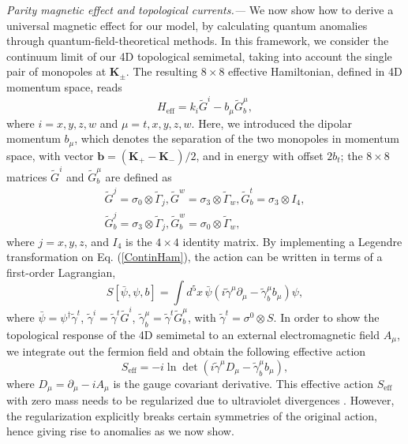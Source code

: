 \documentclass[twocolumn,prl,10pt,superscriptaddress]{revtex4}
\begin{document}
\emph{Parity magnetic effect and topological currents.---}
We now show how to derive a universal magnetic effect for our model, by calculating quantum anomalies through quantum-field-theoretical methods. In this framework, we consider the continuum limit of our 4D topological semimetal, taking into account the single pair of monopoles at ${\boldsymbol K}_{\pm}$. The resulting $8\times8$ effective Hamiltonian, defined in 4D momentum space, reads
\begin{equation}\label{ContinHam}
H_{\text{eff}}=k_{i}\tilde{G}^{i}-b_{\mu}\tilde{G}_b^{\mu},
\end{equation}
where $i=x,y,z,w$ and $\mu=t,x,y,z,w$. Here, we introduced the dipolar momentum $b_{\mu}$, which denotes the separation of the two monopoles in momentum space, with vector ${\boldsymbol b}=({\boldsymbol K}_+-{\boldsymbol K}_-)/2$, and in energy with offset $2b_t$; the $8\times8$ matrices $\tilde{G}^{i}$ and $\tilde{G}_b^{\mu}$ are defined as
\begin{eqnarray}
  \tilde{G}^{j}=\sigma_0\otimes\tilde{\Gamma}_{j}, \tilde{G}^{w}=\sigma_3\otimes\tilde{\Gamma}_{w}, \tilde{G}^{t}_b=\sigma_3\otimes I_4, \nonumber \\  \tilde{G}^{j}_b=\sigma_3\otimes\tilde{\Gamma}_{j}, \tilde{G}^{w}_b=\sigma_0\otimes\tilde{\Gamma}_{w},
  \end{eqnarray}
  where $j=x,y,z$, and $I_4$ is the $4\times4$ identity matrix.  By implementing a Legendre transformation on Eq. (\ref{ContinHam}), the action can be written in terms of a first-order Lagrangian,
\begin{equation}
S[\bar{\psi},\psi,b]=\int d^5x\,\bar{\psi}(i\tilde{\gamma}^{\mu}\partial_{\mu}-\tilde{\gamma}^{\mu}_bb_{\mu})\psi,
\end{equation}
where $\bar{\psi}=\psi^{\dagger}\tilde{\gamma}^t$, $\tilde{\gamma}^{i}=\tilde{\gamma}^t\tilde{G}^{i}$, $\tilde{\gamma}^{\mu}_b=\tilde{\gamma}^t\tilde{G}_b^{\mu}$, with $\tilde{\gamma}^t=\sigma^0\otimes S$. In order to show the topological response of the 4D semimetal to an external electromagnetic field $A_{\mu}$, we integrate out the fermion field and obtain the following effective action
\begin{equation}\label{effaction}
S_{\text{eff}}=-i\ln \det(i\tilde{\gamma}^{\mu}D_{\mu}-\tilde{\gamma}^{\mu}_bb_{\mu}),
\end{equation}
where $D_{\mu}=\partial_{\mu}-iA_{\mu}$ is the gauge covariant derivative. This effective action $S_{\text{eff}}$ with zero mass  needs to be regularized due to ultraviolet divergences \cite{Redlich}. However, the regularization explicitly breaks certain symmetries of the original action, hence giving rise to anomalies as we now show.
\end{document}
